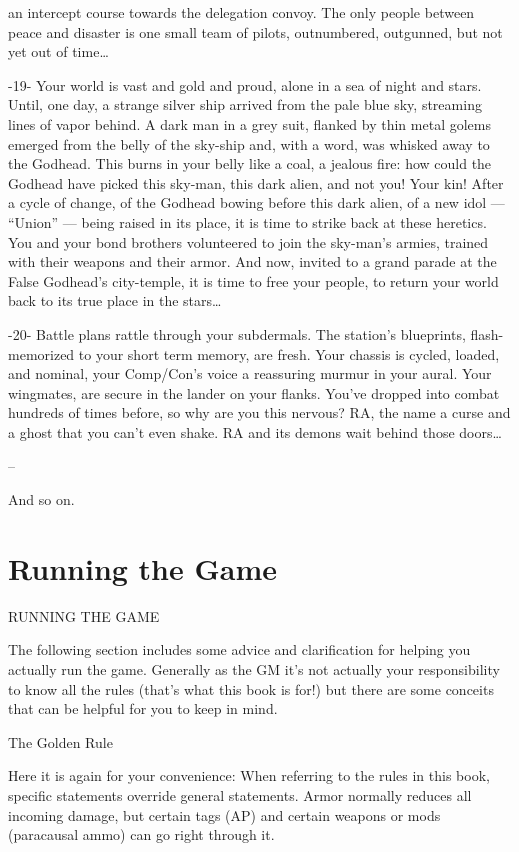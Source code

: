 an intercept course towards the delegation convoy. The only people between peace and disaster
is one small team of pilots, outnumbered, outgunned, but not yet out of time…

                                                        -19-
Your world  is vast and gold and proud, alone in a sea of night and stars. Until, one day, a strange
silver ship arrived from the pale blue sky, streaming lines of vapor behind. A dark man in a grey
suit, flanked by thin metal golems emerged from the belly of the sky-ship and, with a word, was
whisked away to the Godhead. This burns in your belly like a coal, a jealous fire: how could the
Godhead have picked this sky-man, this dark alien, and not you! Your kin! After a cycle of change,
of the Godhead bowing before this dark alien, of a new idol — “Union” — being raised in its
place, it is time to strike back at these heretics. You and your bond brothers volunteered to join
the sky-man’s armies, trained with their weapons and their armor. And now, invited to a grand
parade at the False Godhead’s city-temple, it is time to free your people, to return your world
back to its true place in the stars…

                                                        -20-
Battle plans rattle through your subdermals. The station’s blueprints, flash-memorized to your
short term memory, are fresh. Your chassis is cycled, loaded, and nominal, your Comp/Con’s
voice a reassuring murmur in your aural. Your wingmates, are secure in the lander on your flanks.
You’ve dropped into combat hundreds of times before, so why are you this nervous? RA, the
name a curse and a ghost that you can’t even shake. RA and its demons wait behind those
doors…

--

And so on.

\chapter{Running the Game}
RUNNING THE GAME

The following section includes some advice and clarification for helping you actually run the
game. Generally as the GM it’s not actually your responsibility to know all the rules (that’s what
this book is for!) but there are some conceits that can be helpful for you to keep in mind.


                                            The Golden Rule

Here it is again for your convenience: When referring to the rules in this book, specific
statements override general statements. Armor normally reduces all incoming damage, but
certain tags (AP) and certain weapons or mods (paracausal ammo) can go right through it.


